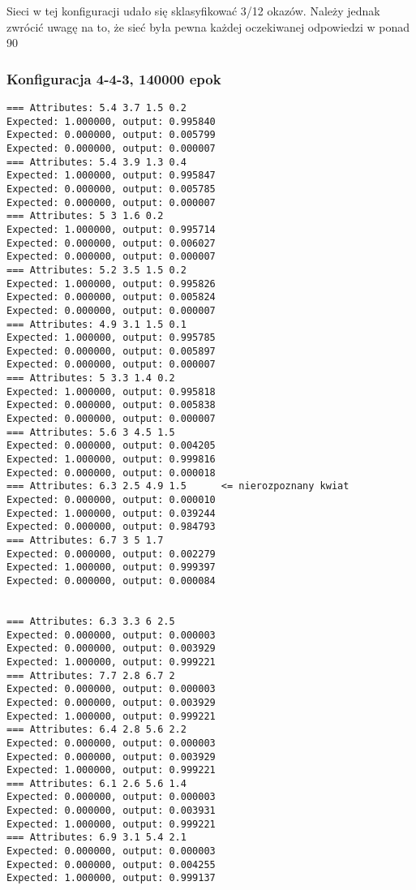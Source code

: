 \documentclass{classrep}
\begin{document}
Sieci w tej konfiguracji udało się sklasyfikować 3/12 okazów. Należy jednak zwrócić uwagę na to, że sieć była pewna każdej oczekiwanej odpowiedzi w ponad 90%

\subsubsection{Konfiguracja 4-4-3, 140000 epok}
\begin{lstlisting}[]
=== Attributes: 5.4 3.7 1.5 0.2 
Expected: 1.000000, output: 0.995840
Expected: 0.000000, output: 0.005799
Expected: 0.000000, output: 0.000007
=== Attributes: 5.4 3.9 1.3 0.4 
Expected: 1.000000, output: 0.995847
Expected: 0.000000, output: 0.005785
Expected: 0.000000, output: 0.000007
=== Attributes: 5 3 1.6 0.2 
Expected: 1.000000, output: 0.995714
Expected: 0.000000, output: 0.006027
Expected: 0.000000, output: 0.000007
=== Attributes: 5.2 3.5 1.5 0.2 
Expected: 1.000000, output: 0.995826
Expected: 0.000000, output: 0.005824
Expected: 0.000000, output: 0.000007
=== Attributes: 4.9 3.1 1.5 0.1 
Expected: 1.000000, output: 0.995785
Expected: 0.000000, output: 0.005897
Expected: 0.000000, output: 0.000007
=== Attributes: 5 3.3 1.4 0.2 
Expected: 1.000000, output: 0.995818
Expected: 0.000000, output: 0.005838
Expected: 0.000000, output: 0.000007
=== Attributes: 5.6 3 4.5 1.5 
Expected: 0.000000, output: 0.004205
Expected: 1.000000, output: 0.999816
Expected: 0.000000, output: 0.000018
=== Attributes: 6.3 2.5 4.9 1.5      <= nierozpoznany kwiat
Expected: 0.000000, output: 0.000010
Expected: 1.000000, output: 0.039244
Expected: 0.000000, output: 0.984793
=== Attributes: 6.7 3 5 1.7 
Expected: 0.000000, output: 0.002279
Expected: 1.000000, output: 0.999397
Expected: 0.000000, output: 0.000084


=== Attributes: 6.3 3.3 6 2.5 
Expected: 0.000000, output: 0.000003
Expected: 0.000000, output: 0.003929
Expected: 1.000000, output: 0.999221
=== Attributes: 7.7 2.8 6.7 2 
Expected: 0.000000, output: 0.000003
Expected: 0.000000, output: 0.003929
Expected: 1.000000, output: 0.999221
=== Attributes: 6.4 2.8 5.6 2.2 
Expected: 0.000000, output: 0.000003
Expected: 0.000000, output: 0.003929
Expected: 1.000000, output: 0.999221
=== Attributes: 6.1 2.6 5.6 1.4 
Expected: 0.000000, output: 0.000003
Expected: 0.000000, output: 0.003931
Expected: 1.000000, output: 0.999221
=== Attributes: 6.9 3.1 5.4 2.1 
Expected: 0.000000, output: 0.000003
Expected: 0.000000, output: 0.004255
Expected: 1.000000, output: 0.999137
\end{lstlisting}
\end{document}
